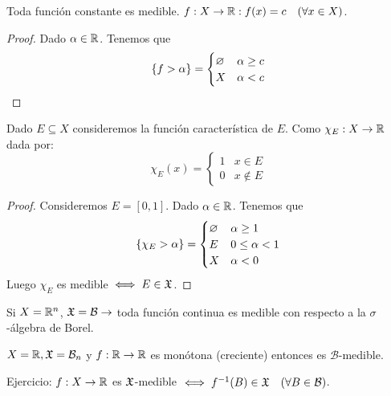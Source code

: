 \begin{eg}
    Toda función constante es medible. $f: X \to \mathbb{R} : f(x) = c \quad (\forall x \in X)$.
    \begin{proof}
        Dado $\alpha \in \mathbb{R}$. Tenemos que \begin{equation}
            \{ f > \alpha \} = \begin{cases}
                \varnothing & \alpha \geq c \\
                X  & \alpha < c
            \end{cases}
        \end{equation}
    \end{proof}
\end{eg}

\begin{eg}
    Dado $E \subseteq X$ consideremos la función característica de $E$. Como $\chi_E: X \to \mathbb{R}$ dada por:
    \begin{equation}
        \chi_E(x) = \begin{cases}
            1 & x \in E    \\
            0 & x \notin E
        \end{cases}
    \end{equation}
    \begin{proof}
        Consideremos $E = [0, 1]$. Dado $\alpha \in \mathbb{R}$. Tenemos que \begin{equation}
            \{ \chi_E > \alpha \} = \begin{cases}
                \varnothing & \alpha \geq 1     \\
                E  & 0 \leq \alpha < 1 \\
                X  & \alpha < 0
            \end{cases}
        \end{equation}
        Luego $\chi_E$ es medible $\iff E \in \mathfrak{X}$.
    \end{proof}
\end{eg}

\begin{eg}
    Si $X = \mathbb{R}^n$, $\mathfrak{X} = \mathcal{B} \to$ toda función continua es medible con respecto a la $\sigma$-álgebra de Borel.
\end{eg}

\begin{eg}
    $X = \mathbb{R}, \mathfrak{X} = \mathcal{B}_n$ y $f: \mathbb{R} \to \mathbb{R}$ es monótona (creciente) entonces es $\mathcal{B}$-medible.
\end{eg}

Ejercicio: $f: X \to \mathbb{R}$ es $\mathfrak{X}$-medible $\iff f^{-1}(B) \in \mathfrak{X} \quad (\forall B \in \mathcal{B})$.

